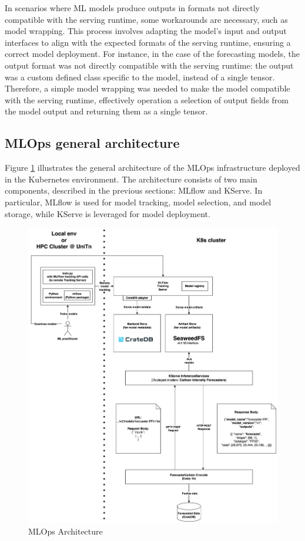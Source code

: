 In scenarios where ML models produce outputs in formats not directly compatible with the serving runtime, some workarounds are necessary, such as model wrapping. This process involves adapting the model's input and output interfaces to align with the expected formats of the serving runtime, ensuring a correct model deployment.
For instance, in the case of the forecasting models, the output format was not directly compatible with the serving runtime: the output was a custom defined class specific to the model, instead of a single tensor. Therefore, a simple model wrapping was needed to make the model compatible with the serving runtime, effectively operation a selection of output fields from the model output and returning them as a single tensor.

\subsection{MLOps general architecture}

Figure \ref{fig:mlops} illustrates the general architecture of the MLOps infrastructure deployed in the Kubernetes environment. 
The architecture consists of two main components, described in the previous sections: MLflow and KServe.
In particular, MLflow is used for model tracking, model selection, and model storage, while KServe is leveraged for model deployment. 

\begin{figure}[H]
  \centering
  \includegraphics[width=1.00\linewidth]{images/mlflow_vertical.png}
  \caption{MLOps Architecture}
  \label{fig:mlops}
\end{figure}

